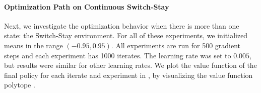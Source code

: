 \documentclass[twoside,11pt]{article}
\begin{document}
\paragraph{Optimization Path on Continuous Switch-Stay}
Next, we investigate the optimization behavior when there is more than one state: the Switch-Stay environment. %
For all of these experiments, we initialized means in the range $(-0.95, 0.95)$. All experiments are run for 500 gradient steps and each experiment has 1000 iterates. The learning rate was set to $0.005$, but results were similar for other learning rates. We plot the value function of the final policy for each iterate and experiment in , by visualizing the value function polytope \citep{dadashi2019value}. 
\end{document}
